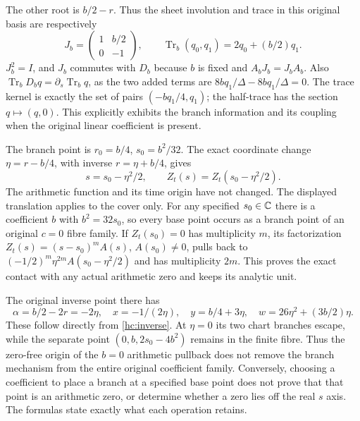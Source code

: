 The other root is $b/2-r$. Thus the sheet involution and trace in this
original basis are respectively
\[
J_b=\begin{pmatrix}1&b/2\\0&-1\end{pmatrix},\qquad
\operatorname{Tr}_b(q_0,q_1)=2q_0+(b/2)q_1.
\]
$J_b^2=I$, and $J_b$ commutes with $D_b$ because $b$ is fixed and
$A_bJ_b=J_bA_b$. Also
$\operatorname{Tr}_b D_bq=\partial_s\operatorname{Tr}_bq$, as the
two added terms are $8bq_1/\Delta-8bq_1/\Delta=0$.
The trace kernel is exactly the set of pairs $(-bq_1/4,q_1)$;
the half-trace has the section $q\mapsto(q,0)$.
This explicitly exhibits the branch information and its coupling
when the original linear coefficient is present.

The branch point is $r_0=b/4$, $s_0=b^2/32$. The exact coordinate
change $\eta=r-b/4$, with inverse $r=\eta+b/4$, gives
\begin{equation}
s=s_0-\eta^2/2,
\qquad Z_t(s)=Z_t(s_0-\eta^2/2).
\label{hc:translated-branch}
\end{equation}
The arithmetic function and its time origin have not changed.
The displayed translation applies to the cover only. For any specified
$s_0\in\mathbb C$ there is a coefficient $b$ with $b^2=32s_0$, so every
base point occurs as a branch point of an original $c=0$ fibre family.
If $Z_t(s_0)=0$ has multiplicity $m$, its factorization
$Z_t(s)=(s-s_0)^m A(s)$, $A(s_0)\ne0$, pulls back to
$(-1/2)^m\eta^{2m}A(s_0-\eta^2/2)$ and has multiplicity $2m$.
This proves the exact contact with any actual arithmetic zero and
keeps its analytic unit.

The original inverse point there has
\[
\alpha=b/2-2r=-2\eta,\quad
x=-1/(2\eta),\quad y=b/4+3\eta,\quad
w=26\eta^2+(3b/2)\eta.
\]
These follow directly from \eqref{hc:inverse}. At $\eta=0$ its two
chart branches escape, while the separate point
$(0,b,2s_0-4b^2)$ remains in the finite fibre. Thus the zero-free
origin of the $b=0$ arithmetic pullback does not remove the branch
mechanism from the entire original coefficient family. Conversely,
choosing a coefficient to place a branch at a specified base point
does not prove that that point is an arithmetic zero, or determine
whether a zero lies off the real $s$ axis. The formulas state exactly
what each operation retains.

